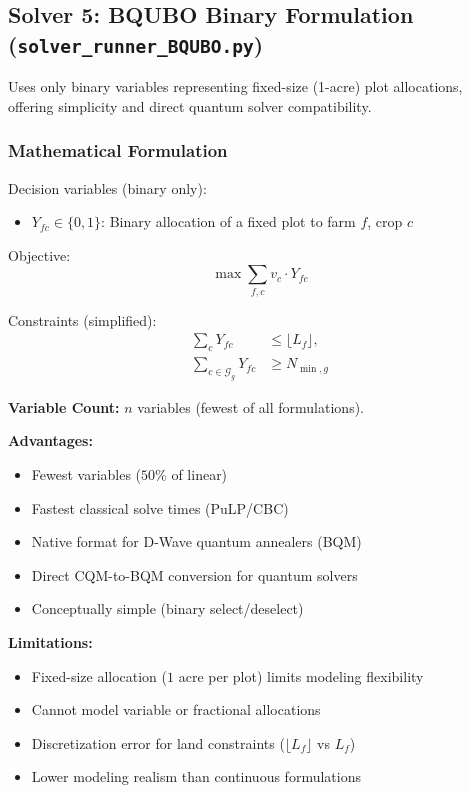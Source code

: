 \documentclass[11pt,a4paper]{article}
\begin{document}
\subsection{Solver 5: BQUBO Binary Formulation (\texttt{solver\_runner\_BQUBO.py})}

Uses only binary variables representing fixed-size (1-acre) plot allocations, offering simplicity and direct quantum solver compatibility.

\subsubsection{Mathematical Formulation}

Decision variables (binary only):
\begin{itemize}
    \item $Y_{fc} \in \{0,1\}$: Binary allocation of a fixed plot to farm $f$, crop $c$
\end{itemize}

Objective:
\begin{equation}
\max \sum_{f,c} v_c \cdot Y_{fc}
\end{equation}

Constraints (simplified):
\begin{align}
\sum_{c} Y_{fc} &\leq \lfloor L_f \rfloor, \\
\sum_{c \in \mathcal{G}_g} Y_{fc} &\geq N_{\min,g}
\end{align}

\textbf{Variable Count:} $n$ variables (fewest of all formulations).

\textbf{Advantages:}
\begin{itemize}
    \item Fewest variables ($50\%$ of linear)
    \item Fastest classical solve times (PuLP/CBC)
    \item Native format for D-Wave quantum annealers (BQM)
    \item Direct CQM-to-BQM conversion for quantum solvers
    \item Conceptually simple (binary select/deselect)
\end{itemize}

\textbf{Limitations:}
\begin{itemize}
    \item Fixed-size allocation ($1$ acre per plot) limits modeling flexibility
    \item Cannot model variable or fractional allocations
    \item Discretization error for land constraints ($\lfloor L_f \rfloor$ vs $L_f$)
    \item Lower modeling realism than continuous formulations
\end{itemize}
\end{document}
